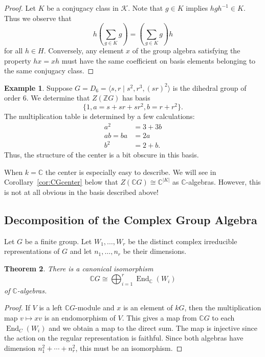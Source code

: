 \documentclass[12pt]{article}
\theoremstyle{plain}
\newtheorem{theorem}{Theorem}[section]
\theoremstyle{definition}
\newtheorem{example}[theorem]{Example}
\theoremstyle{remark}
\numberwithin{equation}{section}
\begin{document}
\begin{proof}
Let $K$ be a conjugacy class in $\mathcal{K}$.
Note that $g \in K$ implies
$hgh^{-1} \in K$.
Thus we observe that
\[
h\left(\sum_{g \in K} g\right)
=\left(\sum_{g \in K} g\right) h
\]
for all $h \in H$. 
Conversely, any element $x$ of the group algebra
satisfying the property $hx=xh$ must have the same coefficient
on basis elements belonging to the same conjugacy class.
\end{proof}

\begin{example}
Suppose $G=D_6=\langle s,r \mid s^2, r^3, (sr)^2 \rangle$
is the dihedral group of order $6$.
We determine that
$Z(\mathbb{Z}G)$ has basis
\[
\{ 1, a = s+sr+sr^2, b = r+r^2 \}.
\]
The multiplication table is determined by a few calculations:
\begin{align*}
a^2 &= 3+3b\\
ab=ba &= 2a\\
b^2 &=2+b.
\end{align*}
Thus, the structure of the center is a bit obscure in this basis.
\end{example}

When $k=\mathbb{C}$ the center is especially easy to describe.
We will see in Corollary~\ref{cor:CGcenter} below that
$Z(\mathbb{C}G) \cong \mathbb{C}^{|K|}$ as $\mathbb{C}$-algebras.
However, this is not at all obvious in the
basis described above!

\subsection{Decomposition of the Complex Group Algebra}

Let $G$ be a finite group.
Let $W_1,\ldots,W_r$ be the distinct
complex irreducible representations of $G$
and let $n_1,\ldots, n_r$ be their dimensions.

\begin{theorem}
There is a canonical isomorphism
\[
\mathbb{C}G \cong \bigoplus_{i=1}^r \operatorname{End}_{\mathbb{C}}(W_i)
\]
of $\mathbb{C}$-algebras.
\end{theorem}

\begin{proof}
If $V$ is a left $\mathbb{C}G$-module and $x$ is an element of $kG$,
then the multiplication map $v \mapsto xv$ is an endomorphism
of $V$.
This gives a map from $\mathbb{C}G$ to each
$\operatorname{End}_C(W_i)$ and we obtain
a map to the direct sum.
The map is injective since the action on the regular representation
is faithful.
Since both algebras have dimension $n_1^2+\cdots+n_r^2$,
this must be an isomorphism.
\end{proof}
\end{document}
